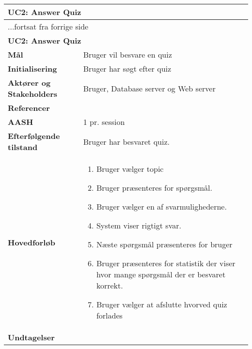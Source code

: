 \begin{center} \centering \label{ucAnswerQuiz}
	\begin{longtable}{|p{4.6cm}|p{9.4cm}|}  %
		\hline
		\multicolumn{2}{|l|}{\textbf{UC2: Answer Quiz}} \\\hline
		\endfirsthead
		
		\multicolumn{2}{l}{...fortsat fra forrige side} \\ \hline %
		\multicolumn{2}{|l|}{\textbf{UC2: Answer Quiz}} \\\hline
		\endhead	
		
		\textbf{Mål}						&Bruger vil besvare en quiz
		\\\hline
		\textbf{Initialisering}			&Bruger har søgt efter quiz
		\\\hline
		\textbf{Aktører og Stakeholders}	&Bruger, Database server og Web server
		\\\hline 
		\textbf{Referencer}				&
		\\\hline
		\textbf{AASH}					&1 pr. session
		\\\hline
		\textbf{Efterfølgende tilstand}	&Bruger har besvaret quiz.
		\\\hline
		\textbf{Hovedforløb}					
			&\begin{enumerate}
			\item Bruger vælger topic
			\item\label{ucAnswerQuizQPresent} Bruger præsenteres for spørgsmål.
			\item Bruger vælger en af svarmulighederne. 
			\item System viser rigtigt svar.
			\item\label{ucAnswerQuizQEnd} Næste spørgsmål præsenteres for bruger \newline
			[Punkt \ref{ucAnswerQuizQPresent} - \ref{ucAnswerQuizQEnd} gentages indtil der ikke er flere spørgsmål i quiz]
			\item Bruger præsenteres for statistik der viser hvor mange spørgsmål der er 	besvaret korrekt.
			\item Bruger vælger at afslutte hvorved quiz forlades


			\end{enumerate}\\\hline
		\textbf{Undtagelser}
			&			
			\\\hline
	\end{longtable} 
\end{center}